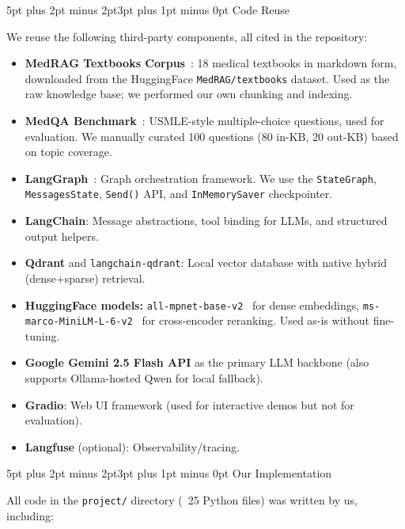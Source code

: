 \documentclass[10pt,twocolumn,letterpaper]{article}
\makeatletter
\renewcommand\section{\@startsection{section}{1}{\z@}%
  {5pt plus 2pt minus 2pt}{3pt plus 1pt minus 0pt}%
  {\large\bfseries}}
\makeatother
\begin{document}
\section{Code Reuse}

We reuse the following third-party components, all cited in the repository:

\begin{itemize}[nosep,leftmargin=*]
\item \textbf{MedRAG Textbooks Corpus}~\cite{xiong2024benchmarking}: 18 medical textbooks in markdown form, downloaded from the HuggingFace \texttt{MedRAG/textbooks} dataset. Used as the raw knowledge base; we performed our own chunking and indexing.
\item \textbf{MedQA Benchmark}~\cite{jin2021disease}: USMLE-style multiple-choice questions, used for evaluation. We manually curated 100 questions (80 in-KB, 20 out-KB) based on topic coverage.
\item \textbf{LangGraph}~\cite{langgraph}: Graph orchestration framework. We use the \texttt{StateGraph}, \texttt{MessagesState}, \texttt{Send()} API, and \texttt{InMemorySaver} checkpointer.
\item \textbf{LangChain}: Message abstractions, tool binding for LLMs, and structured output helpers.
\item \textbf{Qdrant} and \texttt{langchain-qdrant}: Local vector database with native hybrid (dense+sparse) retrieval.
\item \textbf{HuggingFace models:} \texttt{all-mpnet-base-v2}~\cite{reimers2019sentence} for dense embeddings, \texttt{ms-marco-MiniLM-L-6-v2}~\cite{nogueira2019passage} for cross-encoder reranking. Used as-is without fine-tuning.
\item \textbf{Google Gemini 2.5 Flash API} as the primary LLM backbone (also supports Ollama-hosted Qwen for local fallback).
\item \textbf{Gradio}: Web UI framework (used for interactive demos but not for evaluation).
\item \textbf{Langfuse} (optional): Observability/tracing.
\end{itemize}

\section{Our Implementation}

All code in the \texttt{project/} directory (~25 Python files) was written by us, including:
\end{document}
